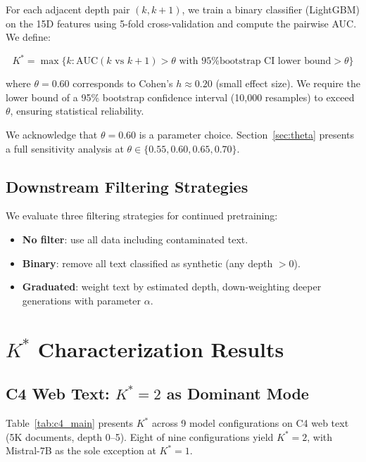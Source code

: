 \documentclass[11pt]{article}
\newcommand{\kstar}{K^*}
\newcommand{\thetaval}{\theta}
\begin{document}
For each adjacent depth pair $(k, k{+}1)$, we train a binary classifier (LightGBM) on the 15D features using 5-fold cross-validation and compute the pairwise AUC. We define:

\begin{equation}
    \kstar = \max\{k : \text{AUC}(k \text{ vs } k{+}1) > \thetaval \text{ with 95\% bootstrap CI lower bound} > \thetaval\}
\end{equation}

where $\thetaval = 0.60$ corresponds to Cohen's $h \approx 0.20$ (small effect size). We require the lower bound of a 95\% bootstrap confidence interval (10,000 resamples) to exceed $\thetaval$, ensuring statistical reliability.

We acknowledge that $\thetaval = 0.60$ is a parameter choice. Section~\ref{sec:theta} presents a full sensitivity analysis at $\thetaval \in \{0.55, 0.60, 0.65, 0.70\}$.

\subsection{Downstream Filtering Strategies}

We evaluate three filtering strategies for continued pretraining:
\begin{itemize}[nosep]
    \item \textbf{No filter}: use all data including contaminated text.
    \item \textbf{Binary}: remove all text classified as synthetic (any depth $> 0$).
    \item \textbf{Graduated}: weight text by estimated depth, down-weighting deeper generations with parameter $\alpha$.
\end{itemize}


\section{$\kstar$ Characterization Results}
\label{sec:results}

\subsection{C4 Web Text: $\kstar{=}2$ as Dominant Mode}
\label{sec:c4}

Table~\ref{tab:c4_main} presents $\kstar$ across 9 model configurations on C4 web text (5K documents, depth 0--5). Eight of nine configurations yield $\kstar{=}2$, with Mistral-7B as the sole exception at $\kstar{=}1$.
\end{document}
